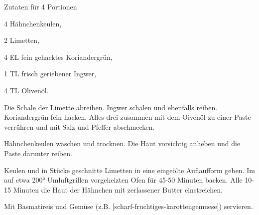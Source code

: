 \startsection[title={Limetten/Ingwer Hühnchen},
              reference=limetten-ingwer-huehnchen]

\startitemize
\item Zutaten für 4 Portionen
      \startitemize
      \item 4 Hähnchenkeulen,
      \item 2 Limetten,
      \item 4 EL fein gehacktes Koriandergrün,
      \item 1 TL frisch geriebener Ingwer,
      \item 4 TL Olivenöl.
      \stopitemize

\item Die Schale der Limette abreiben. Ingwer schälen und ebenfalls
  reiben. Koriandergrün fein hacken. Alles drei zusammen mit dem
  Oivenöl zu einer Paste verrühren und mit Salz und Pfeffer abschmecken.
\item Hähnchenkeulen waschen und trocknen. Die Haut vorsichtig anheben
  und die Paste darunter reiben.
\item Keulen und in Stücke geschnitte Limetten in eine eingeölte
  Auflaufform geben. Im auf etwa 200° Umluftgrillen vorgeheizten Ofen
  für 45-50 Minuten backen. Alle 10-15 Minuten die Haut der Hähnchen mit
  zerlassener Butter einstreichen.
\item Mit Basmatireis und Gemüse (z.B. [scharf-fruchtiges-karottengemuese]) servieren.
\stopitemize

\stopsection
